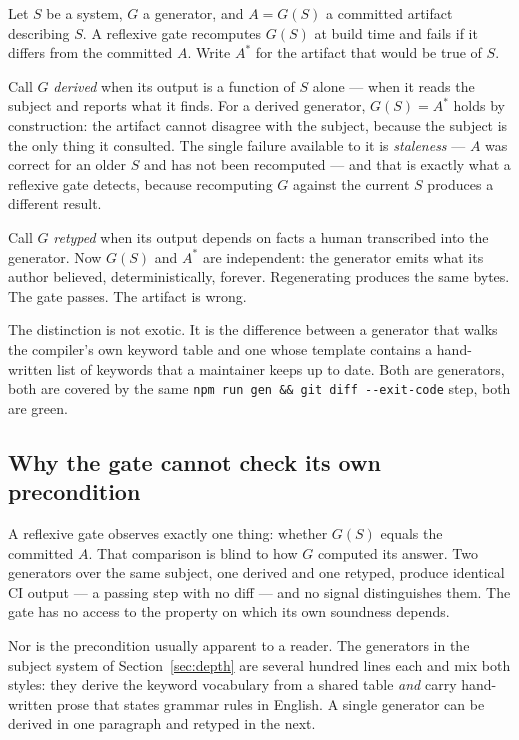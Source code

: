 \documentclass[10pt,journal,compsoc]{IEEEtran}
\begin{document}
Let $S$ be a system, $G$ a generator, and $A = G(S)$ a committed artifact describing
$S$. A reflexive gate recomputes $G(S)$ at build time and fails if it differs from the
committed $A$. Write $A^{\ast}$ for the artifact that would be true of $S$.

Call $G$ \emph{derived} when its output is a function of $S$ alone --- when it reads
the subject and reports what it finds. For a derived generator, $G(S) = A^{\ast}$ holds
by construction: the artifact cannot disagree with the subject, because the subject is
the only thing it consulted. The single failure available to it is \emph{staleness} ---
$A$ was correct for an older $S$ and has not been recomputed --- and that is exactly
what a reflexive gate detects, because recomputing $G$ against the current $S$ produces
a different result.

Call $G$ \emph{retyped} when its output depends on facts a human transcribed into the
generator. Now $G(S)$ and $A^{\ast}$ are independent: the generator emits what its
author believed, deterministically, forever. Regenerating produces the same bytes.
The gate passes. The artifact is wrong.

The distinction is not exotic. It is the difference between a generator that walks the
compiler's own keyword table and one whose template contains a hand-written list of
keywords that a maintainer keeps up to date. Both are generators, both are covered by
the same \texttt{npm run gen \&\& git diff -{}-exit-code} step, both are green.

\subsection{Why the gate cannot check its own precondition}

A reflexive gate observes exactly one thing: whether $G(S)$ equals the committed $A$.
That comparison is blind to how $G$ computed its answer. Two generators over the same
subject, one derived and one retyped, produce identical CI output --- a passing step
with no diff --- and no signal distinguishes them. The gate has no access to the
property on which its own soundness depends.

Nor is the precondition usually apparent to a reader. The generators in the subject
system of Section~\ref{sec:depth} are several hundred lines each and mix both styles:
they derive the keyword vocabulary from a shared table \emph{and} carry hand-written
prose that states grammar rules in English. A single generator can be derived in one
paragraph and retyped in the next.
\end{document}
